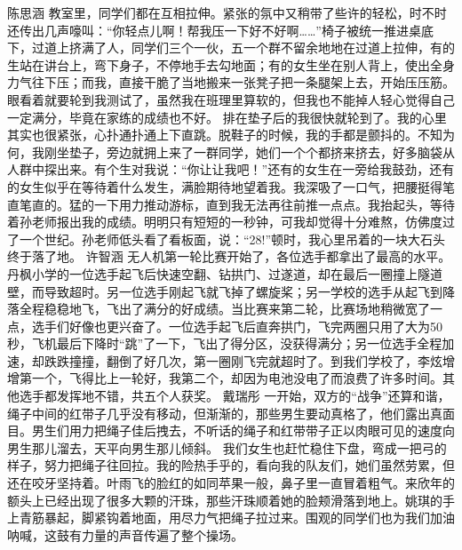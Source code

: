 \markdownRendererInterblockSeparator
{}\markdownRendererInterblockSeparator
{}陈思涵\markdownRendererInterblockSeparator
{}教室里，同学们都在互相拉伸。紧张的氛中又稍带了些许的轻松，时不时还传出几声嚎叫：“你轻点儿啊！帮我压一下好不好啊……”椅子被统一推进桌底下，过道上挤满了人，同学们三个一伙，五一个群不留余地地在过道上拉伸，有的生站在讲台上，弯下身子，不停地手去勾地面；有的女生坐在别人背上，使出全身力气往下压；而我，直接干脆了当地搬来一张凳子把一条腿架上去，开始压压筋。眼看着就要轮到我测试了，虽然我在班理里算软的，但我也不能掉人轻心觉得自己一定满分，毕竟在家练的成绩也不好。\markdownRendererInterblockSeparator
{}排在垫子后的我很快就轮到了。我的心里其实也很紧张，心扑通扑通上下直跳。脱鞋子的时候，我的手都是颤抖的。不知为何，我刚坐垫子，旁边就拥上来了一群同学，她们一个个都挤来挤去，好多脑袋从人群中探出来。有个生对我说：“你让让我吧！”还有的女生在一旁给我鼓劲，还有的女生似乎在等待着什么发生，满脸期待地望着我。我深吸了一口气，把腰挺得笔直笔直的。猛的一下用力推动游标，直到我无法再往前推一点点。我抬起头，等待着孙老师报出我的成绩。明明只有短短的一秒钟，可我却觉得十分难熬，仿佛度过了一个世纪。孙老师低头看了看板面，说：“28!”顿时，我心里吊着的一块大石头终于落了地。\markdownRendererInterblockSeparator
{}\markdownRendererInterblockSeparator
{}许智涵\markdownRendererInterblockSeparator
{}无人机第一轮比赛开始了，各位选手都拿出了最高的水平。丹枫小学的一位选手起飞后快速空翻、钻拱门、过遂道，却在最后一圈撞上隧道壁，而导致超时。另一位选手刚起飞就飞掉了螺旋桨；另一学校的选手从起飞到降落全程稳稳地飞，飞出了满分的好成绩。当比赛来第二轮，比赛场地稍微宽了一点，选手们好像也更兴奋了。一位选手起飞后直奔拱门，飞完两圈只用了大为50秒，飞机最后下降时“跳”了一下，飞出了得分区，没获得满分；另一位选手全程加速，却跌跌撞撞，翻倒了好几次，第一圈刚飞完就超时了。到我们学校了，李炫增增第一个，飞得比上一轮好，我第二个，却因为电池没电了而浪费了许多时间。其他选手都发挥地不错，共五个人获奖。\markdownRendererInterblockSeparator
{}\markdownRendererInterblockSeparator
{}戴瑞彤\markdownRendererInterblockSeparator
{}一开始，双方的“战争”还算和谐，绳子中间的红带子几乎没有移动，但渐渐的，那些男生要动真格了，他们露出真面目。男生们用力把绳子佳后拽去，不听话的绳子和红带带子正以肉眼可见的速度向男生那儿溜去，天平向男生那儿倾斜。\markdownRendererInterblockSeparator
{}我们女生也赶忙稳住下盘，弯成一把弓的样子，努力把绳子往回拉。我的险热手乎的，看向我的队友们，她们虽然劳累，但还在咬牙坚持着。叶雨飞的脸红的如同苹果一般，鼻子里一直冒着粗气。来欣年的额头上已经出现了很多大颗的汗珠，那些汗珠顺着她的脸颊滑落到地上。姚琪的手上青筋暴起，脚紧钩着地面，用尽力气把绳子拉过来。围观的同学们也为我们加油呐喊，这鼓有力量的声音传遍了整个操场。\markdownRendererInterblockSeparator
